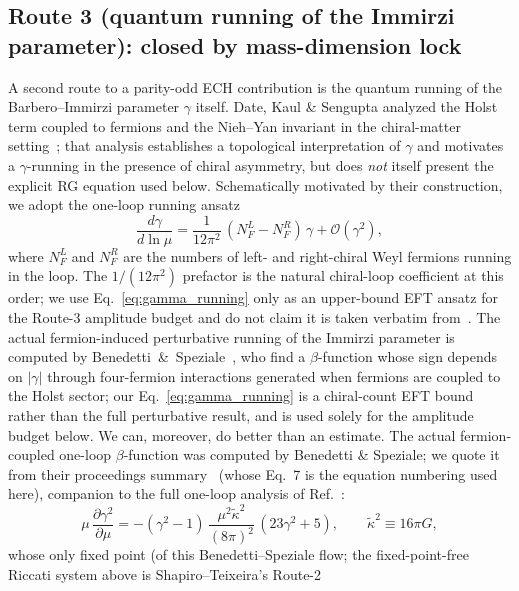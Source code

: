 \documentclass[aps,prd,twocolumn,superscriptaddress,showpacs,preprintnumbers,nofootinbib,longbibliography,floatfix]{revtex4-2}
\begin{document}
\subsection{Route 3 (quantum running of the Immirzi parameter):
closed by mass-dimension lock}
\label{sec:r3_immirzi}
A second route to a parity-odd ECH contribution is the quantum running
of the Barbero--Immirzi parameter $\gamma$ itself. Date, Kaul \& Sengupta
analyzed the Holst term coupled to fermions and the Nieh--Yan
invariant in the chiral-matter setting~\cite{DateKaulSengupta2009};
that analysis establishes a topological interpretation of $\gamma$
and motivates a $\gamma$-running in the presence of chiral asymmetry,
but does \emph{not} itself present the explicit RG equation used
below. Schematically motivated by their construction, we adopt the
one-loop running ansatz
\begin{equation}
\frac{d\gamma}{d\ln \mu}
= \frac{1}{12\pi^2}\,(N_F^L - N_F^R) \, \gamma + \mathcal{O}(\gamma^2),
\label{eq:gamma_running}
\end{equation}
where $N_F^L$ and $N_F^R$ are the numbers of left- and right-chiral
Weyl fermions running in the loop. The $1/(12\pi^2)$ prefactor is
the natural chiral-loop coefficient at this order; we use
Eq.~\eqref{eq:gamma_running} only as an upper-bound EFT ansatz
for the Route-3 amplitude budget and do not claim it is taken
verbatim from~\cite{DateKaulSengupta2009}. The actual fermion-induced
perturbative running of the Immirzi parameter is computed by
Benedetti~\&~Speziale~\cite{Benedetti2011}, who find a $\beta$-function
whose sign depends on $|\gamma|$ through four-fermion interactions
generated when fermions are coupled to the Holst sector; our
Eq.~\eqref{eq:gamma_running} is a chiral-count EFT bound rather than
the full perturbative result, and is used solely for the amplitude
budget below. We can, moreover, do better than an estimate. The actual fermion-coupled
one-loop $\beta$-function was computed by Benedetti \& Speziale; we
quote it from their proceedings
summary~\cite{BenedettiSpeziale2011run} (whose Eq.~7 is the equation
numbering used here), companion to the full one-loop analysis of
Ref.~\cite{Benedetti2011}:
\begin{equation}
\mu\,\frac{\partial\gamma^2}{\partial\mu}
= -(\gamma^2-1)\,\frac{\mu^2\tilde\kappa^2}{(8\pi)^2}\,(23\gamma^2+5),
\qquad \tilde\kappa^2 \equiv 16\pi G,
\label{eq:bs_beta}
\end{equation}
whose only fixed point (of this Benedetti--Speziale flow; the
fixed-point-free Riccati system above is Shapiro--Teixeira's Route-2
\end{document}
